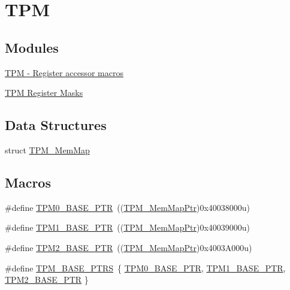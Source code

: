 \hypertarget{group___t_p_m___peripheral}{}\section{T\+P\+M}
\label{group___t_p_m___peripheral}
\subsection*{Modules}
\begin{DoxyCompactItemize}
\item 
\hyperlink{group___t_p_m___register___accessor___macros}{T\+P\+M -\/ Register accessor macros}
\item 
\hyperlink{group___t_p_m___register___masks}{T\+P\+M Register Masks}
\end{DoxyCompactItemize}
\subsection*{Data Structures}
\begin{DoxyCompactItemize}
\item 
struct \hyperlink{struct_t_p_m___mem_map}{T\+P\+M\+\_\+\+Mem\+Map}
\end{DoxyCompactItemize}
\subsection*{Macros}
\begin{DoxyCompactItemize}
\item 
\#define \hyperlink{group___t_p_m___peripheral_ga8ba6c6fb69345639750108c3289a24c4}{T\+P\+M0\+\_\+\+B\+A\+S\+E\+\_\+\+P\+T\+R}~((\hyperlink{group___t_p_m___peripheral_ga32147338cedc9904efff0d19b3a358ac}{T\+P\+M\+\_\+\+Mem\+Map\+Ptr})0x40038000u)
\item 
\#define \hyperlink{group___t_p_m___peripheral_ga3c3f533f8c87c74f2bbc3a4de83d1181}{T\+P\+M1\+\_\+\+B\+A\+S\+E\+\_\+\+P\+T\+R}~((\hyperlink{group___t_p_m___peripheral_ga32147338cedc9904efff0d19b3a358ac}{T\+P\+M\+\_\+\+Mem\+Map\+Ptr})0x40039000u)
\item 
\#define \hyperlink{group___t_p_m___peripheral_ga37cc120e7475fb646fe9bc15b57f06bc}{T\+P\+M2\+\_\+\+B\+A\+S\+E\+\_\+\+P\+T\+R}~((\hyperlink{group___t_p_m___peripheral_ga32147338cedc9904efff0d19b3a358ac}{T\+P\+M\+\_\+\+Mem\+Map\+Ptr})0x4003\+A000u)
\item 
\#define \hyperlink{group___t_p_m___peripheral_ga1d61ed554c056d8f63d1dbcc7ce05e62}{T\+P\+M\+\_\+\+B\+A\+S\+E\+\_\+\+P\+T\+R\+S}~\{ \hyperlink{group___t_p_m___peripheral_ga8ba6c6fb69345639750108c3289a24c4}{T\+P\+M0\+\_\+\+B\+A\+S\+E\+\_\+\+P\+T\+R}, \hyperlink{group___t_p_m___peripheral_ga3c3f533f8c87c74f2bbc3a4de83d1181}{T\+P\+M1\+\_\+\+B\+A\+S\+E\+\_\+\+P\+T\+R}, \hyperlink{group___t_p_m___peripheral_ga37cc120e7475fb646fe9bc15b57f06bc}{T\+P\+M2\+\_\+\+B\+A\+S\+E\+\_\+\+P\+T\+R} \}
\end{DoxyCompactItemize}
